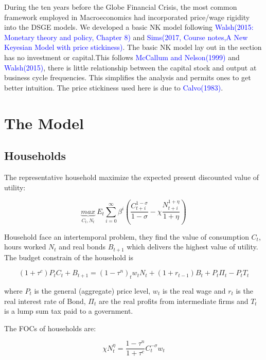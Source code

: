 \documentclass[cn,10pt,math=newtx,citestyle=gb7714-2015,bibstyle=gb7714-2015]{elegantbook}
\begin{document}
	During the ten years before the Globe Financial Crisis, the most common framework employed in Macroeconomics had incorporated price/wage rigidity into the DSGE models. We developed a basic NK model following \textcolor{blue}{Walsh(2015: Monetary theory and policy, Chapter 8)} and \textcolor{blue}{Sims(2017, Course notes,A New Keyesian Model with price stickiness)}. The basic NK model lay out in the section has no investment or capital.This follows \textcolor{blue}{McCallum and Nelson(1999)} and \textcolor{blue}{Walsh(2015)}, there is little relationship between the capital stock and output at business cycle frequencies. This simplifies the analysis and permits ones to get better intuition. The price stickiness used here is due to \textcolor{blue}{Calvo(1983)}.
	
	\section{The Model}
	\subsection{Households}
	
	The representative household maximize the expected present discounted value of utility:
	
	\begin{equation}
		\underbrace{max}_{C_t,N_t}~E_t \sum_{i=0}^{\infty}\beta^i\left(\frac{C_{t+i}^{1-\sigma}}{1-\sigma}-\chi \frac{N_{t+i}^{1+\eta}}{1+\eta}\right)
	\end{equation}
	
	Household face an intertemporal problem, they find the value of consumption $C_t$, hours worked $N_t$ and real bonds $B_{t+1}$ which delivers the highest value of utility. The budget constrain of the household is
	
	\begin{equation}
		(1+\tau^c)P_tC_t+B_{t+1}=(1-\tau^n)_tw_tN_t+(1+r_{t-1})B_t+P_t\Pi_t-P_tT_t
	\end{equation}
	
	where $P_t$ is the general (aggregate) price level, $w_t$ is the real wage and $r_t$ is the real interest rate of Bond, $\Pi_t$ are the real profits from intermediate firms and $T_t$ is a lump sum tax paid to a government.
	
	The FOCs of households are:
	
	\begin{equation}
		\chi N_t^{\eta}=\frac{1-\tau^n}{1+\tau^c}C_t^{-\sigma}w_t
	\end{equation}
	
\end{document}
